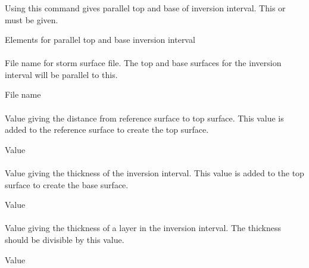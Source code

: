 \subsubsection{} 
 \slist
   \item \Description Using this command gives parallel top and base of inversion interval. This or  must be given.
   \item \Argument Elements for parallel top and base inversion interval
   \item \Default
 \elist

\paragraph{} 
 \slist
   \item \Description File name for storm surface file. The top and base surfaces for the inversion interval will be parallel to this.
   \item \Argument File name
   \item \Default
 \elist

\paragraph{} 
 \slist
   \item \Description Value giving the distance from reference surface to top surface. This value is added to the reference surface to create the top surface.
   \item \Argument Value
   \item \Default
 \elist

\paragraph{}
 \slist
   \item \Description Value giving the thickness of the inversion interval. This value is added to the top surface to create the base surface.
   \item \Argument Value
   \item \Default
 \elist

\paragraph{}
 \slist
   \item \Description Value giving the thickness of a layer in the inversion interval. The thickness should be divisible by this value.
   \item \Argument Value
   \item \Default
 \elist


